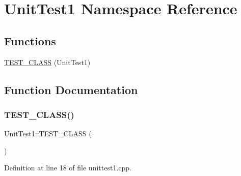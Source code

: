 \hypertarget{namespace_unit_test1}{}\section{Unit\+Test1 Namespace Reference}
\label{namespace_unit_test1}
\subsection*{Functions}
\begin{DoxyCompactItemize}
\item 
\hyperlink{namespace_unit_test1_a72947bdb044a2f5ee054fe1c31e79255}{T\+E\+S\+T\+\_\+\+C\+L\+A\+SS} (Unit\+Test1)
\end{DoxyCompactItemize}


\subsection{Function Documentation}
\mbox{\label{namespace_unit_test1_a72947bdb044a2f5ee054fe1c31e79255}} 
\subsubsection{\texorpdfstring{T\+E\+S\+T\+\_\+\+C\+L\+A\+S\+S()}{TEST\_CLASS()}}
{\footnotesize\ttfamily Unit\+Test1\+::\+T\+E\+S\+T\+\_\+\+C\+L\+A\+SS (\begin{DoxyParamCaption}\item[{Unit\+Test1}]{ }\end{DoxyParamCaption})}



Definition at line 18 of file unittest1.\+cpp.

